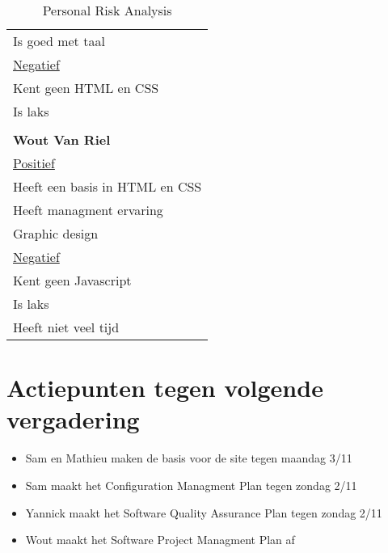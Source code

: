 \begin{longtable}{l}
  Is goed met taal \\
  \underline{Negatief} \\
  Kent geen HTML en CSS \\
  Is laks \\
\\
  \textbf{Wout Van Riel} \\
  \hline
  \underline{Positief} \\
  Heeft een basis in HTML en CSS \\
  Heeft managment ervaring \\
  Graphic design \\
  \underline{Negatief} \\
  Kent geen Javascript \\
  Is laks \\
  Heeft niet veel tijd 
 
\caption{Personal Risk Analysis}
\label{tab:pra}
\end{longtable}

\section{Actiepunten tegen volgende vergadering}
\begin{itemize}
\item Sam en Mathieu maken de basis voor de site tegen maandag 3/11
\item Sam maakt het Configuration Managment Plan tegen zondag 2/11
\item Yannick maakt het Software Quality Assurance Plan tegen zondag 2/11
\item Wout maakt het Software Project Managment Plan af
\end{itemize}

